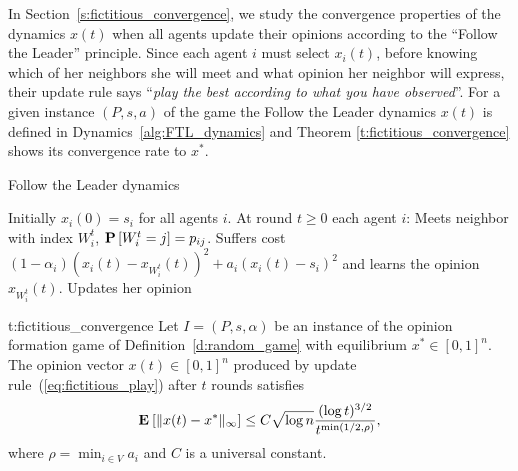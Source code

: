 In Section~\ref{s:fictitious_convergence}, we study the convergence properties
of the dynamics $x(t)$ when all agents update their opinions
according to the \enquote{Follow the Leader} principle.
Since each agent $i$ must select $x_i(t)$, before knowing which of her neighbors she
will meet and what opinion her neighbor will express, their update rule
says \enquote{\emph{play the best according to what you have observed}}.
For a given instance $(P,s,a)$ of the game %
the Follow the Leader dynamics $x(t)$ is defined in Dynamics~\ref{alg:FTL_dynamics} and
Theorem \ref{t:fictitious_convergence} shows its convergence rate to $x^*$.
%
\begin{algorithm}
  \caption{Follow the Leader dynamics}
  \label{alg:FTL_dynamics}
  \begin{algorithmic}[1]
    \STATE Initially $x_i(0) = s_i$ for all agents $i$.
    \STATE At round $t\geq 0$ each agent $i$:
    \bindent
    \STATE Meets neighbor with index $W_i^t$, $\bm{\mathrm{P}}\left[W_i^t=j\right]=p_{ij}$.
    \STATE Suffers cost \((1-\alpha_i) (x_i(t) - x_{W_i^t}(t))^2 + a_i (x_i(t) - s_i)^2\)
    and learns the opinion $x_{W_i^t}(t)$.
  \STATE Updates her opinion
    \eindent
  \end{algorithmic}
\end{algorithm}
%

%
\begin{reptheorem}{t:fictitious_convergence}
  Let $I = (P,s, \alpha)$ be an instance of the opinion formation
  game of Definition~\ref{d:random_game} with equilibrium
  $x^* \in [0,1]^n$.  The opinion vector $x(t)\in[0,1]^n$ produced by
  update rule~(\ref{eq:fictitious_play}) after $t$ rounds satisfies
  \[
    \bm{\mathrm{E}}_{} \left[ \| x(t) - x^* \|_{\infty} \right] \leq
    C \sqrt{\log n}\frac{(\log t)^{3/2}}{t^{\min(1/2,\rho)}},
  \]
  where $\rho = \min_{i \in V} a_i$ and $C$ is a universal constant.
\end{reptheorem}


